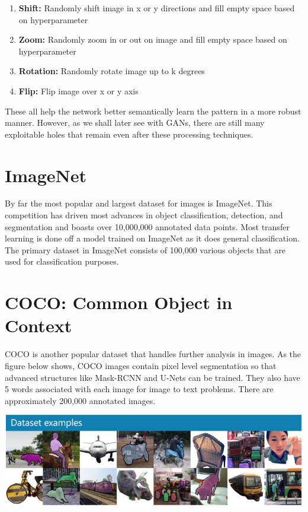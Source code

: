 \documentclass{article}
\begin{document}
\begin{enumerate}
  \item \textbf{Shift:} Randomly shift image in x or y directions and fill empty space based on hyperparameter
  \item \textbf{Zoom:} Randomly zoom in or out on image and fill empty space based on hyperparameter
  \item \textbf{Rotation:} Randomly rotate image up to k degrees
  \item \textbf{Flip:} Flip image over x or y axis
\end{enumerate}

These all help the network better semantically learn the pattern in a more robust manner. However, as we shall later see with GANs, there are still many exploitable holes that remain even after these processing techniques.

\section{ImageNet}
By far the most popular and largest dataset for images is ImageNet. This competition has driven most advances in object classification, detection, and segmentation and boasts over 10,000,000 annotated data points. Most transfer learning is done off a model trained on ImageNet as it does general classification. The primary dataset in ImageNet consists of 100,000 various objects that are used for classification purposes.

\section{COCO: Common Object in Context}
COCO is another popular dataset that handles further analysis in images. As the figure below shows, COCO images contain pixel level segmentation so that advanced structures like Mask-RCNN and U-Nets can be trained. They also have 5 words associated with each image for image to text problems. There are approximately 200,000 annotated images.


\begin{center}
\includegraphics[scale=0.45]{coco.PNG}
\end{center}
\end{document}
